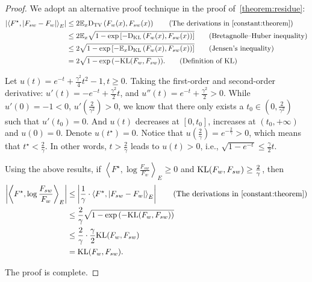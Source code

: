 \begin{proof}
We adopt an alternative proof technique in the proof of~\cref{theorem:residue}:
\begin{align*}
    \left| \left \langle F^\star, \left\vert F_{sw}-F_w \right\vert \right \rangle_E \right| & \le 2 \expect_x \tv \left( F_w(x), F_{sw}(x) \right) \tag{The derivations in~\cref{constant:theorem}} \\
    & \le 2 \expect_x \sqrt{1- \exp{\left[-\mathrm{D}_{\mathrm{KL}} \left( F_w(x), F_{sw}(x) \right)\right]}} \tag{Bretagnolle–Huber inequality} \\ 
    & \le 2 \sqrt{1- \exp{\left[-\expect_x \mathrm{D}_{\mathrm{KL}} \left( F_w(x), F_{sw}(x) \right)\right]}} \tag{Jensen’s inequality} \\ 
    & = 2 \sqrt{1- \exp{\left(-\kl(F_w, F_{sw})\right)}}. \tag{Definition of $\kl$}
\end{align*}

Let $u(t)=e^{-t} + \frac{\gamma^2}{4}t^2 - 1, t \ge 0$.
Taking the first-order and second-order derivative:
$u'(t)=-e^{-t} + \frac{\gamma^2}{2}t$, and $u''(t)=e^{-t} + \frac{\gamma^2}{2} > 0$.
While $u'(0)=-1<0$, $u'(\frac{2}{\gamma^2}) >0$, we know that there only exists a $t_0 \in (0,\frac{2}{\gamma^2})$ such that $u'(t_0)=0$.
And $u(t)$ decreases at $[0,t_0]$, increases at $(t_0, +\infty)$ and $u(0)=0$.
Denote $u(t^\star)=0$.
Notice that $u(\frac{2}{\gamma})=e^{-\frac{2}{\gamma}} > 0$, which means that $t^\star < \frac{2}{\gamma}$.
In other words, $t > \frac{2}{\gamma}$ leads to $u(t)>0$, i.e., $\sqrt{1-e^{-t}} \le \frac{\gamma}{2}t$.


Using the above results, if $\left \langle F^\star, \log{\frac{F_{sw}}{F_w}} \right \rangle_E \ge 0$ and $\mathrm{KL}(F_w, F_{sw}) \ge \frac{2}{\gamma}$, then 
\begin{align*}
    \left| \left \langle F^\star, \log{\frac{F_{sw}}{F_w}} \right \rangle_E \right| & \le \left| \frac{1}{\gamma} \cdot \left \langle F^\star, \left\vert F_{sw}-F_w \right\vert  \right \rangle_E \right| \tag{The derivations in~\cref{constant:theorem}} \\ 
    & \le \frac{2}{\gamma} \sqrt{1- \exp{\left(-\kl(F_w, F_{sw})\right)}} \\
    & \le \frac{2}{\gamma} \cdot \frac{\gamma}{2} \kl(F_w, F_{sw}) \\
    & = \kl(F_w, F_{sw}).
\end{align*}

The proof is complete.

\end{proof}





